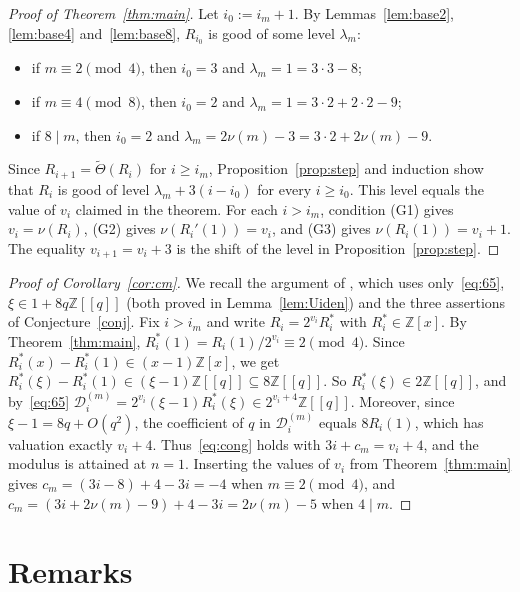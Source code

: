 \documentclass[11pt]{amsart}
\theoremstyle{definition}
\theoremstyle{remark}
\newcommand{\Z}{\mathbb{Z}}
\newcommand{\Th}{\widetilde{\Theta}}
\newcommand{\Dc}{\mathcal{D}}
\begin{document}
\begin{proof}[Proof of Theorem~\ref{thm:main}]
Let $i_0:=i_m+1$. By Lemmas~\ref{lem:base2}, \ref{lem:base4} and~\ref{lem:base8}, $R_{i_0}$ is good of some level $\lambda_m$:
\begin{itemize}
\item if $m\equiv2\pmod4$, then $i_0=3$ and $\lambda_m=1=3\cdot3-8$;
\item if $m\equiv4\pmod8$, then $i_0=2$ and $\lambda_m=1=3\cdot2+2\cdot2-9$;
\item if $8\mid m$, then $i_0=2$ and $\lambda_m=2\nu(m)-3=3\cdot 2+2\nu(m)-9$.
\end{itemize}
Since $R_{i+1}=\Th(R_i)$ for $i\ge i_m$, Proposition~\ref{prop:step} and induction show that $R_i$ is good of level $\lambda_m+3(i-i_0)$ for every $i\ge i_0$. This level equals the value of $v_i$ claimed in the theorem. For each $i>i_m$, condition (G1) gives $v_i=\nu(R_i)$, (G2) gives $\nu(R_i'(1))=v_i$, and (G3) gives $\nu(R_i(1))=v_i+1$. The equality $v_{i+1}=v_i+3$ is the shift of the level in Proposition~\ref{prop:step}.
\end{proof}

\begin{proof}[Proof of Corollary~\ref{cor:cm}]
We recall the argument of \cite[proof of Cor.~6.3]{ST}, which uses only~\eqref{eq:65}, $\xi\in1+8q\Z[[q]]$ (both proved in Lemma~\ref{lem:Uiden}) and the three assertions of Conjecture~\ref{conj}. Fix $i>i_m$ and write $R_i=2^{v_i}R^\ast_i$ with $R^\ast_i\in\Z[x]$. By Theorem~\ref{thm:main}, $R^\ast_i(1)=R_i(1)/2^{v_i}\equiv 2\pmod 4$. Since $R^\ast_i(x)-R^\ast_i(1)\in(x-1)\Z[x]$, we get $R^\ast_i(\xi)-R^\ast_i(1)\in(\xi-1)\Z[[q]]\subseteq8\Z[[q]]$. So $R^\ast_i(\xi)\in2\Z[[q]]$, and by~\eqref{eq:65} $\Dc_i^{(m)}=2^{v_i}(\xi-1)R^\ast_i(\xi)\in2^{v_i+4}\Z[[q]]$. Moreover, since $\xi-1=8q+O(q^2)$, the coefficient of $q$ in $\Dc^{(m)}_i$ equals $8R_i(1)$, which has valuation exactly $v_i+4$. Thus~\eqref{eq:cong} holds with $3i+c_m=v_i+4$, and the modulus is attained at $n=1$. Inserting the values of $v_i$ from Theorem~\ref{thm:main} gives $c_m=(3i-8)+4-3i=-4$ when $m\equiv2\pmod4$, and $c_m=(3i+2\nu(m)-9)+4-3i=2\nu(m)-5$ when $4\mid m$.
\end{proof}

\section{Remarks}\label{sec:remarks}
\end{document}
